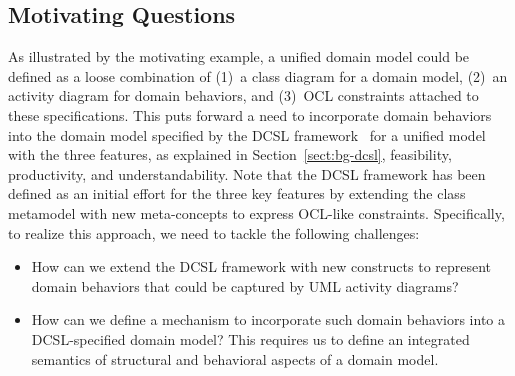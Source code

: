 \subsection{Motivating Questions}

As illustrated by the motivating example, a unified domain model could be defined as a loose combination of (1)~a class diagram for a domain model, (2)~an activity diagram for domain behaviors, and (3)~OCL constraints attached to these specifications. This puts forward a need to incorporate domain behaviors into the domain model specified by the DCSL framework~\cite{le_domain_2018} for a unified model with the three features, as explained in Section~\ref{sect:bg-dcsl}, feasibility, productivity, and understandability. Note that the DCSL framework has been defined as an initial effort for the three key features by extending the class metamodel with new meta-concepts to express OCL-like constraints.
Specifically, to realize this approach, we need to tackle the following challenges:

\begin{itemize}
    \item How can we extend the DCSL framework with new constructs to represent domain behaviors that could be captured by UML activity diagrams?
    \item How can we define a mechanism to incorporate such domain behaviors into a DCSL-specified domain model? This requires us to define an integrated semantics of structural and behavioral aspects of a domain model.
\end{itemize}


